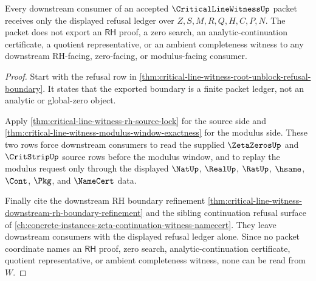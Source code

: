 \begin{theorem}
\label{thm:critical-line-witness-downstream-refusal-ledger}
Every downstream consumer of an accepted $\CriticalLineWitnessUp$ packet
receives only the displayed refusal ledger over
$Z,S,M,R,Q,H,C,P,N$. The packet does not export an $\mathsf{RH}$ proof, a zero
search, an analytic-continuation certificate, a quotient representative, or
an ambient completeness witness to any downstream RH-facing, zero-facing, or
modulus-facing consumer.
\end{theorem}
\begin{proof}
Start with the refusal row in
\autoref{thm:critical-line-witness-root-unblock-refusal-boundary}. It states
that the exported boundary is a finite packet ledger, not an analytic or
global-zero object.

Apply \autoref{thm:critical-line-witness-rh-source-lock} for the source side
and \autoref{thm:critical-line-witness-modulus-window-exactness} for the
modulus side. These two rows force downstream consumers to read the supplied
$\ZetaZerosUp$ and $\CritStripUp$ source rows before the modulus window, and
to replay the modulus request only through the displayed $\NatUp$,
$\RealUp$, $\RatUp$, $\hsame$, $\Cont$, $\Pkg$, and $\NameCert$ data.

Finally cite the downstream RH boundary refinement
\autoref{thm:critical-line-witness-downstream-rh-boundary-refinement} and the
sibling continuation refusal surface of
\autoref{ch:concrete-instances-zeta-continuation-witness-namecert}. They
leave downstream consumers with the displayed refusal ledger alone. Since no
packet coordinate names an $\mathsf{RH}$ proof, zero search,
analytic-continuation certificate, quotient representative, or ambient
completeness witness, none can be read from $W$.
\end{proof}
